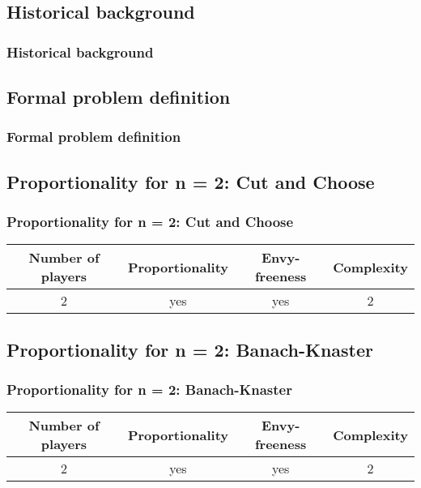 \documentclass{beamer}
\begin{document}
\subsection{Historical background}
\begin{frame}
\frametitle{Historical background}
\end{frame}


\subsection{Formal problem definition}
\begin{frame}
\frametitle{Formal problem definition}
\end{frame}


\subsection{Proportionality for n = 2: Cut and Choose}
\begin{frame}
\frametitle{Proportionality for n = 2: Cut and Choose}
\begin{table}
\begin{tabular}{c|c|c|c|}
Number of players & Proportionality & Envy-freeness & Complexity \\
\hline 
2 & yes & yes & 2 \\
\end{tabular}
\end{table}
\end{frame}

\subsection{Proportionality for n = 2: Banach-Knaster}
\begin{frame}
\frametitle{Proportionality for n = 2: Banach-Knaster}
\begin{table}
\begin{tabular}{c|c|c|c|}
Number of players & Proportionality & Envy-freeness & Complexity \\
\hline 
2 & yes & yes & 2 \\
\end{tabular}
\end{table}

\end{frame}
\end{document}

